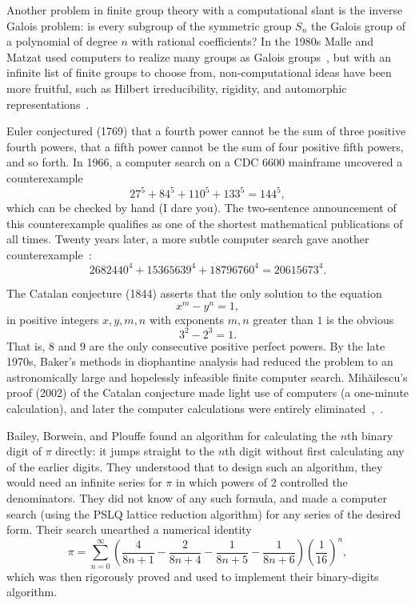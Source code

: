 \documentclass{llncs}
\begin{document}

Another problem in finite group theory with a computational slant is
the inverse Galois problem: is every subgroup of the symmetric group
$S_n$ the Galois group of a polynomial of degree $n$ with rational
coefficients?  In the 1980s Malle and Matzat used computers to realize
many groups as Galois groups~\cite{MM}, but with an infinite list of
finite groups to choose from, non-computational ideas have been more
fruitful, such as Hilbert irreducibility, rigidity, and automorphic
representations~\cite{KLS}.

\smallskip

Euler conjectured (1769) that a fourth power cannot be the sum of
three positive fourth powers, that a fifth power cannot be the sum of
four positive fifth powers, and so forth.  In 1966, a computer search
\cite{LP66} on a CDC 6600 mainframe uncovered a counterexample
\[
27^5 + 84^5 + 110^5 + 133^5 = 144^5,
\]
which can be checked by hand (I dare you).  The two-sentence
announcement of this counterexample qualifies as one of the shortest
mathematical publications of all times.  Twenty years later, a more
subtle computer search gave another counterexample~\cite{Elkies88}:
\[
2682440^4 + 15365639^4 + 18796760^4 = 20615673^4.
\]


\smallskip

The Catalan conjecture (1844) asserts that the only solution to the equation
\[
x^m - y^n = 1,
\]
in positive integers $x,y,m,n$ with exponents $m,n$ greater than $1$
is the obvious
\[
3^2 - 2^3 = 1.
\]
That is, $8$ and $9$ are the only consecutive positive perfect powers.
By the late 1970s, Baker's methods in diophantine analysis had reduced
the problem to an astronomically large and hopelessly infeasible finite
computer search.  Mih\u ailescu's proof (2002) of the Catalan
conjecture made light use of computers (a one-minute calculation), and
later the computer calculations were entirely eliminated~\cite{Mih},~\cite{TM03}.

\smallskip



Bailey, Borwein, and Plouffe found an algorithm for calculating the
$n$th binary digit of $\pi$ directly: it jumps straight to the $n$th
digit without first calculating any of the earlier digits.  They
understood that to design such an algorithm, they would need an
infinite series for $\pi$ in which powers of $2$ controlled the
denominators.  They did not know of any such formula, and made a
computer search (using the PSLQ lattice reduction algorithm) for any
series of the desired form.  Their search unearthed a numerical
identity
\[
\pi = \sum_{n=0}^\infty 
\left(
\frac{4}{8n+1} - \frac{2}{8n+4} - \frac{1}{8n+5} - \frac{1}{8n+6}
\right) 
\left(\frac{1}{16}\right)^n,
\]
which was then rigorously proved and used to implement their
binary-digits algorithm.
\end{document}
